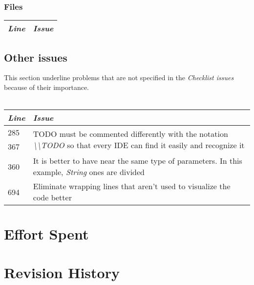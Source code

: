 \documentclass[11pt,a4paper]{report}
\begin{document}
\subsection{Files}
\begin{tabularx}{\textwidth}{|l|X|}
	\hline
	\textit{Line} & \textit{Issue}\\
	\hline
\end{tabularx}
\section{Other issues}
This section underline problems that are not specified in the \textit{Checklist issues} because of their importance.\\\\
\begin{tabularx}{\textwidth}{|l|X|}
	\hline
	\textit{Line} & \textit{Issue}\\
	\hline
	285 & \multirow{2}{*}{TODO must be commented differently with the notation \textit{\textbackslash\textbackslash TODO} so that every IDE can find it easily and recognize it}\\
	367 & \\
	\hline
	360 & It is better to have near the same type of parameters. In this example, \textit{String} ones are divided\\
	\hline
	694 & Eliminate wrapping lines that aren't used to visualize the code better\\
	\hline
\end{tabularx}
\chapter{Effort Spent}
\chapter{Revision History}
\end{document}
